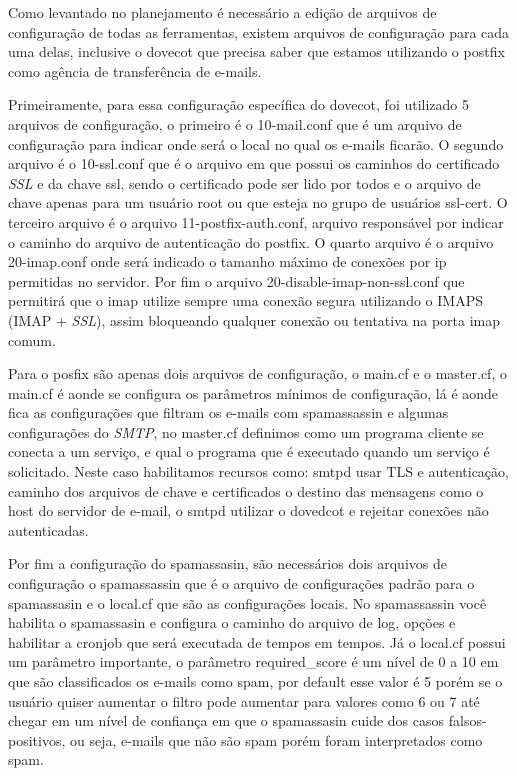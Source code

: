 Como levantado no planejamento é necessário a edição de arquivos de configuração
de todas as ferramentas, existem arquivos de configuração para cada uma delas, inclusive
o dovecot que precisa saber que estamos utilizando o postfix como agência de transferência
de e-mails.

Primeiramente, para essa configuração específica do dovecot, foi utilizado 5 arquivos
de configuração, o primeiro é o 10-mail.conf que é um arquivo de configuração para
indicar onde será o local no qual os e-mails ficarão. O segundo arquivo é o 10-ssl.conf
que é o arquivo em que possui os caminhos do certificado \textit{SSL} e da chave ssl, sendo o
certificado pode ser lido por todos e o arquivo de chave apenas para um usuário root
ou que esteja no grupo de usuários ssl-cert. O terceiro arquivo é o arquivo
11-postfix-auth.conf, arquivo responsável por indicar o caminho do arquivo de autenticação
do postfix. O quarto arquivo é o arquivo 20-imap.conf onde será indicado o tamanho
máximo de conexões por ip permitidas no servidor. Por fim o arquivo
20-disable-imap-non-ssl.conf que permitirá que o imap utilize sempre uma conexão
segura utilizando o IMAPS (IMAP + \textit{SSL}), assim bloqueando qualquer conexão ou
tentativa na porta imap comum.

Para o posfix são apenas dois arquivos de configuração, o main.cf e o master.cf,
o main.cf é aonde se configura os parâmetros mínimos de configuração, lá é aonde fica as configurações que filtram os e-mails com spamassassin e algumas configurações do \textit{SMTP}, no
master.cf definimos como um programa cliente se conecta a um serviço, e qual o
programa que é executado quando um serviço é solicitado. Neste caso habilitamos
recursos como: smtpd usar TLS e autenticação, caminho dos arquivos de chave e certificados
o destino das mensagens como o host do servidor de e-mail, o smtpd utilizar o dovedcot
e rejeitar conexões não autenticadas.

Por fim a configuração do spamassasin, são necessários dois arquivos de configuração
o spamassassin que é o arquivo de configurações padrão para o spamassasin e o
local.cf que são as configurações locais. No spamassassin você habilita o spamassasin
e configura o caminho do arquivo de log, opções e habilitar a cronjob que será
executada de tempos em tempos. Já o local.cf possui um parâmetro importante, o
parâmetro required\_score é um nível de 0 a 10 em que são classificados os e-mails
como spam, por default esse valor é 5 porém se o usuário quiser aumentar o filtro
pode aumentar para valores como 6 ou 7 até chegar em um nível de confiança em que
o spamassasin cuide dos casos falsos-positivos, ou seja, e-mails que não são spam
porém foram interpretados como spam.

